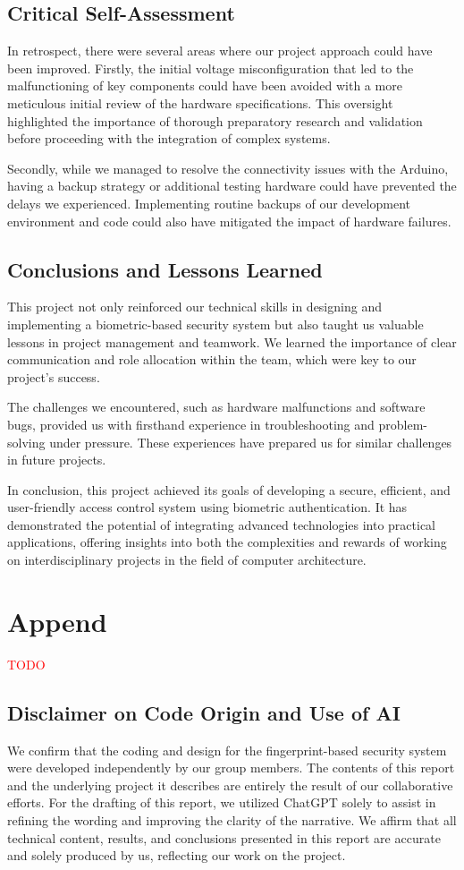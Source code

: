 \documentclass{article}
\begin{document}
\subsection{Critical Self-Assessment}
In retrospect, there were several areas where our project approach could have been improved. Firstly, the initial voltage misconfiguration that led to the malfunctioning of key components could have been avoided with a more meticulous initial review of the hardware specifications. This oversight highlighted the importance of thorough preparatory research and validation before proceeding with the integration of complex systems.

Secondly, while we managed to resolve the connectivity issues with the Arduino, having a backup strategy or additional testing hardware could have prevented the delays we experienced. Implementing routine backups of our development environment and code could also have mitigated the impact of hardware failures.

\subsection{Conclusions and Lessons Learned}
This project not only reinforced our technical skills in designing and implementing a biometric-based security system but also taught us valuable lessons in project management and teamwork. We learned the importance of clear communication and role allocation within the team, which were key to our project's success.

The challenges we encountered, such as hardware malfunctions and software bugs, provided us with firsthand experience in troubleshooting and problem-solving under pressure. These experiences have prepared us for similar challenges in future projects.

In conclusion, this project achieved its goals of developing a secure, efficient, and user-friendly access control system using biometric authentication. It has demonstrated the potential of integrating advanced technologies into practical applications, offering insights into both the complexities and rewards of working on interdisciplinary projects in the field of computer architecture.

\newpage
\section{Append} \textcolor{red}{TODO}

\subsection{Disclaimer on Code Origin and Use of AI}
We confirm that the coding and design for the fingerprint-based security system were developed independently by our group members. The contents of this report and the underlying project it describes are entirely the result of our collaborative efforts. For the drafting of this report, we utilized ChatGPT solely to assist in refining the wording and improving the clarity of the narrative. We affirm that all technical content, results, and conclusions presented in this report are accurate and solely produced by us, reflecting our work on the project.
\end{document}
